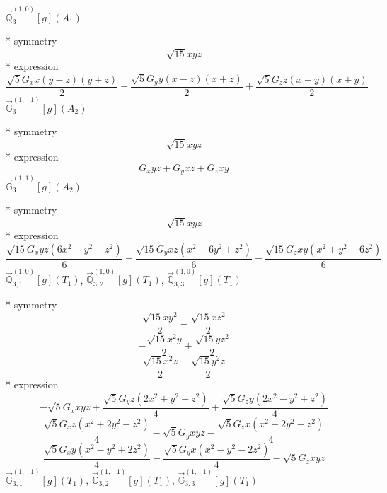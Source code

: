 \documentclass[fleqn,8pt]{jsarticle}
\begin{document}
\noindent\quad $\vec{\mathbb{Q}}_{3}^{(1,0)}[g](A_{1})$

\noindent\quad ** symmetry
\begin{dmath*}
\sqrt{15} x y z
\end{dmath*}
\noindent\quad ** expression
\begin{dmath*}
\frac{\sqrt{5} G_{x} x \left(y - z\right) \left(y + z\right)}{2} - \frac{\sqrt{5} G_{y} y \left(x - z\right) \left(x + z\right)}{2} + \frac{\sqrt{5} G_{z} z \left(x - y\right) \left(x + y\right)}{2}
\end{dmath*}
\noindent\quad $\vec{\mathbb{G}}_{3}^{(1,-1)}[g](A_{2})$

\noindent\quad ** symmetry
\begin{dmath*}
\sqrt{15} x y z
\end{dmath*}
\noindent\quad ** expression
\begin{dmath*}
G_{x} y z + G_{y} x z + G_{z} x y
\end{dmath*}
\noindent\quad $\vec{\mathbb{G}}_{3}^{(1,1)}[g](A_{2})$

\noindent\quad ** symmetry
\begin{dmath*}
\sqrt{15} x y z
\end{dmath*}
\noindent\quad ** expression
\begin{dmath*}
\frac{\sqrt{15} G_{x} y z \left(6 x^{2} - y^{2} - z^{2}\right)}{6} - \frac{\sqrt{15} G_{y} x z \left(x^{2} - 6 y^{2} + z^{2}\right)}{6} - \frac{\sqrt{15} G_{z} x y \left(x^{2} + y^{2} - 6 z^{2}\right)}{6}
\end{dmath*}
\noindent\quad $\vec{\mathbb{Q}}_{3,1}^{(1,0)}[g](T_{1})$, $\vec{\mathbb{Q}}_{3,2}^{(1,0)}[g](T_{1})$, $\vec{\mathbb{Q}}_{3,3}^{(1,0)}[g](T_{1})$

\noindent\quad ** symmetry
\begin{dmath*}
\frac{\sqrt{15} x y^{2}}{2} - \frac{\sqrt{15} x z^{2}}{2}
\end{dmath*}
\begin{dmath*}
- \frac{\sqrt{15} x^{2} y}{2} + \frac{\sqrt{15} y z^{2}}{2}
\end{dmath*}
\begin{dmath*}
\frac{\sqrt{15} x^{2} z}{2} - \frac{\sqrt{15} y^{2} z}{2}
\end{dmath*}
\noindent\quad ** expression
\begin{dmath*}
- \sqrt{5} G_{x} x y z + \frac{\sqrt{5} G_{y} z \left(2 x^{2} + y^{2} - z^{2}\right)}{4} + \frac{\sqrt{5} G_{z} y \left(2 x^{2} - y^{2} + z^{2}\right)}{4}
\end{dmath*}
\begin{dmath*}
\frac{\sqrt{5} G_{x} z \left(x^{2} + 2 y^{2} - z^{2}\right)}{4} - \sqrt{5} G_{y} x y z - \frac{\sqrt{5} G_{z} x \left(x^{2} - 2 y^{2} - z^{2}\right)}{4}
\end{dmath*}
\begin{dmath*}
\frac{\sqrt{5} G_{x} y \left(x^{2} - y^{2} + 2 z^{2}\right)}{4} - \frac{\sqrt{5} G_{y} x \left(x^{2} - y^{2} - 2 z^{2}\right)}{4} - \sqrt{5} G_{z} x y z
\end{dmath*}
\noindent\quad $\vec{\mathbb{G}}_{3,1}^{(1,-1)}[g](T_{1})$, $\vec{\mathbb{G}}_{3,2}^{(1,-1)}[g](T_{1})$, $\vec{\mathbb{G}}_{3,3}^{(1,-1)}[g](T_{1})$
\end{document}
